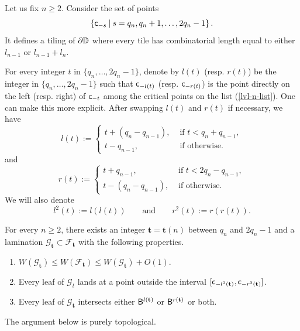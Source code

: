 \documentclass{amsart}
\begin{document}
Let us fix $n\geq 2$. 
Consider the set of points 
\begin{equation}
\label{lvl-n-list}
    \left\{ \mathsf{c}_{-s} \: | \: s=q_n, q_n+1,\ldots, 2q_{n}-1 \right\}.
\end{equation}
It defines a tiling of $\partial \mathbb{D}$ where every tile has combinatorial length equal to either $l_{n-1}$ or $l_{n-1}+l_{n}$.

For every integer $t$ in $\{q_{n}, \ldots, 2q_{n}-1\}$, denote by $l(t)$ (resp. $r(t)$) be the integer in $\{q_{n}, \ldots, 2q_{n}-1\}$ such that
$\mathsf{c}_{-l(t)}$ (resp. $\mathsf{c}_{-r(t)}$) is the point directly on the left (resp. right) of $\mathsf{c}_{-t}$ among the critical points on the list (\ref{lvl-n-list}).
One can make this more explicit.
After swapping $l(t)$ and $r(t)$ if necessary, we have
\[
l(t) := \begin{cases}
    t+ (q_n-q_{n-1}), & \text{ if } t < q_{n} + q_{n-1}, \\
    t-q_{n-1}, & \text{ if otherwise}.
\end{cases}
\]
and
\[
r(t) := \begin{cases}
    t+q_{n-1}, & \text{ if } t < 2q_{n}-q_{n-1}, \\
    t-(q_n-q_{n-1}), & \text{ if otherwise}.
\end{cases}
\]
We will also denote 
\[
l^2(t):= l(l(t)) \qquad \text{and} \qquad r^2(t):=r(r(t)).
\]

\begin{lemma}[Blocking]
\label{lem:blocking}
    For every $n\geq 2$, there exists an integer ${\mathbf{t}} = \mathbf{t}(n)$ between $q_n$ and $2q_{n}-1$ and a lamination $\mathcal{G}_{\mathbf{t}} \subset \mathcal{F}_{\mathbf{t}}$ with the following properties.
    \begin{enumerate}[label=\textnormal{(\arabic*)}]
        \item $W(\mathcal{G}_{\mathbf{t}}) \leq W(\mathcal{F}_{\mathbf{t}}) \leq W(\mathcal{G}_{\mathbf{t}}) + O(1)$.
        \item Every leaf of $\mathcal{G}_t$ lands at a point outside the interval $[\mathsf{c}_{-l^2({\mathbf{t}})}, \mathsf{c}_{-r^2({\mathbf{t}})}]$.
        \item Every leaf of $\mathcal{G}_{\mathbf{t}}$ intersects either $\mathsf{B}^{l({\mathbf{t}})}$ or $\mathsf{B}^{r({\mathbf{t}})}$ or both.
    \end{enumerate}
\end{lemma}

The argument below is purely topological.
\end{document}
